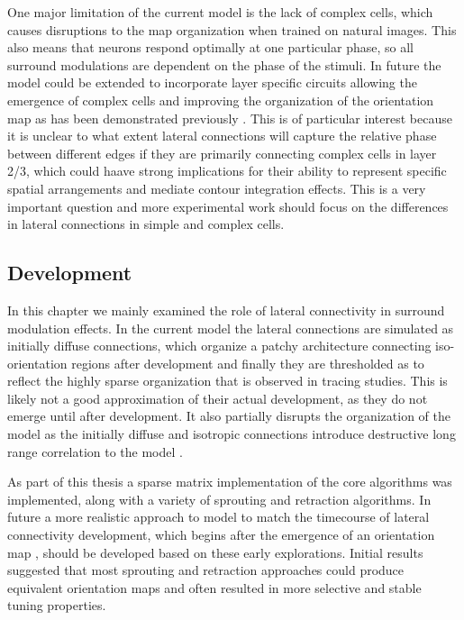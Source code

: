 One major limitation of the current model is the lack of complex
cells, which causes disruptions to the map organization when trained
on natural images. This also means that neurons respond optimally at
one particular phase, so all surround modulations are dependent on the
phase of the stimuli. In future the model could be extended to
incorporate layer specific circuits allowing the emergence of complex
cells and improving the organization of the orientation map as has
been demonstrated previously \citep{Antolik2010}. This is of
particular interest because it is unclear to what extent lateral
connections will capture the relative phase between different edges if
they are primarily connecting complex cells in layer 2/3, which could
haave strong implications for their ability to represent specific
spatial arrangements and mediate contour integration effects. This is
a very important question and more experimental work should focus on
the differences in lateral connections in simple and complex cells.

\subsection{Development}

In this chapter we mainly examined the role of lateral connectivity in
surround modulation effects. In the current model the lateral
connections are simulated as initially diffuse connections, which
organize a patchy architecture connecting iso-orientation regions
after development and finally they are thresholded as to reflect the
highly sparse organization that is observed in tracing studies. This
is likely not a good approximation of their actual development, as
they do not emerge until after development. It also partially disrupts
the organization of the model as the initially diffuse and isotropic
connections introduce destructive long range correlation to the model
\citep{Miikkulainen2005}.

As part of this thesis a sparse matrix implementation of the core
algorithms was implemented, along with a variety of sprouting and
retraction algorithms. In future a more realistic approach to model to
match the timecourse of lateral connectivity development, which begins
after the emergence of an orientation map \citep{Ruthazer1996}, should
be developed based on these early explorations. Initial results
suggested that most sprouting and retraction approaches could produce
equivalent orientation maps and often resulted in more selective and
stable tuning properties.

